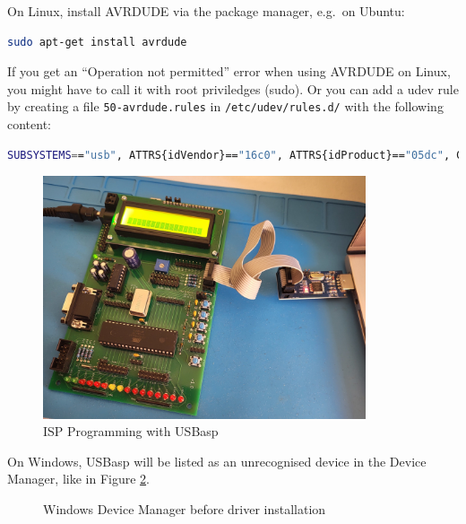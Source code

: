 \documentclass{article}
\newcommand{\file}[1]{\texttt{#1}}
\begin{document}
On Linux, install AVRDUDE via the package manager, e.g.\ on Ubuntu:
\begin{lstlisting}[language=bash]
sudo apt-get install avrdude
\end{lstlisting}
If you get an ``Operation not permitted'' error when using AVRDUDE on Linux, you might have to call it with root priviledges (sudo). Or you can add a udev rule by creating a file \file{50-avrdude.rules} in \file{/etc/udev/rules.d/} with the following content:

\begin{lstlisting}[language=bash]
SUBSYSTEMS=="usb", ATTRS{idVendor}=="16c0", ATTRS{idProduct}=="05dc", GROUP="users", MODE="0666"
\end{lstlisting}

\begin{figure}[htb]
\centering
\includegraphics[width=0.85\textwidth]{Pictures/UsbAspProg.jpg}
\caption{ISP Programming with USBasp}
\label{fig:usbAspProg}
\end{figure}

On Windows, USBasp will be listed as an unrecognised device in the Device Manager, like in Figure \ref{fig:deviceManagerBefore}. 
\begin{figure}[htb]
\centering
{}
\caption{Windows Device Manager before driver installation}
\label{fig:deviceManagerBefore}
\end{figure}
\end{document}
